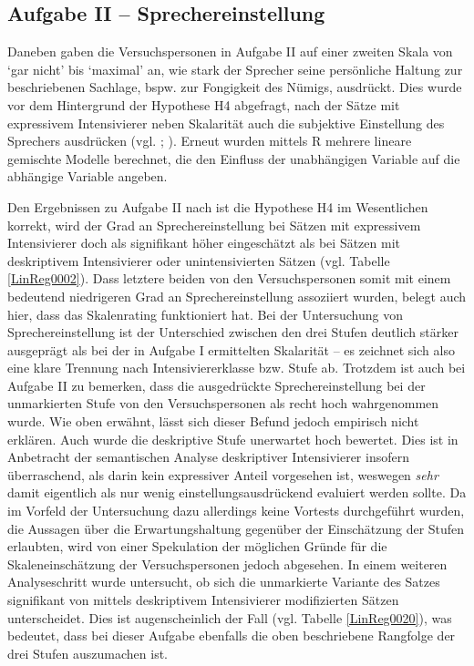 \subsection{Aufgabe II -- Sprechereinstellung}
Daneben gaben die Versuchspersonen in Aufgabe II auf einer zweiten Skala von `gar nicht' bis `maximal' an, wie stark der Sprecher seine persönliche Haltung zur beschriebenen Sachlage, bspw. zur Fongigkeit des Nümigs, ausdrückt. Dies wurde vor dem Hintergrund der Hypothese H4 abgefragt, nach der Sätze mit expressivem Intensivierer neben Skalarität auch die subjektive Einstellung des Sprechers ausdrücken (vgl. \citealt[315]{Lang.1983}; {\citealt[57]{Ortner.2014}}). Erneut wurden mittels R mehrere lineare gemischte Modelle berechnet, die den Einfluss der unabhängigen Variable auf die abhängige Variable angeben.


Den Ergebnissen zu Aufgabe II nach ist die Hypothese H4 im Wesentlichen korrekt, wird der Grad an Sprechereinstellung bei Sätzen mit expressivem Intensivierer doch als signifikant höher eingeschätzt als bei Sätzen mit deskriptivem Intensivierer oder unintensivierten Sätzen (vgl. {Tabelle \ref{LinReg0002}}). Dass letztere beiden von den Versuchspersonen somit mit einem bedeutend niedrigeren Grad an Sprechereinstellung assoziiert wurden, belegt auch hier, dass das Skalenrating funktioniert hat. Bei der Untersuchung von Sprechereinstellung ist der Unterschied zwischen den drei Stufen deutlich stärker ausgeprägt als bei der in Aufgabe I ermittelten Skalarität -- es zeichnet sich also eine klare Trennung nach Intensiviererklasse bzw. Stufe ab. Trotzdem ist auch bei {Aufgabe II} zu bemerken, dass die ausgedrückte Sprechereinstellung bei der unmarkierten Stufe von den Versuchspersonen als recht hoch wahrgenommen wurde. Wie oben erwähnt, lässt sich dieser Befund jedoch empirisch nicht erklären. Auch wurde die deskriptive Stufe unerwartet hoch bewertet. Dies ist in Anbetracht der semantischen Analyse deskriptiver Intensivierer insofern überraschend, als darin kein expressiver Anteil vorgesehen ist, weswegen \textit{sehr} damit eigentlich als nur wenig einstellungsausdrückend evaluiert werden sollte. Da im Vorfeld der Untersuchung dazu allerdings keine Vortests durchgeführt wurden, die Aussagen über die Erwartungshaltung gegenüber der Einschätzung der Stufen erlaubten, wird von einer Spekulation der möglichen Gründe für die Skaleneinschätzung der Versuchspersonen jedoch abgesehen. In einem weiteren Analyseschritt wurde untersucht, ob sich die unmarkierte Variante des Satzes signifikant von mittels deskriptivem Intensivierer modifizierten Sätzen unterscheidet. Dies ist augenscheinlich der Fall (vgl. {Tabelle \ref{LinReg0020}}), was bedeutet, dass bei dieser Aufgabe ebenfalls die oben beschriebene Rangfolge der drei Stufen auszumachen ist.


